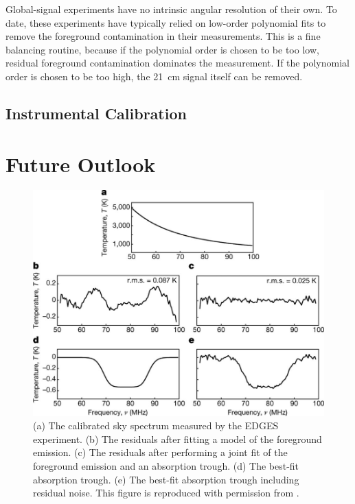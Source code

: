 \begin{bibunit}
Global-signal experiments have no intrinsic angular resolution of their own. To date, these
experiments have typically relied on low-order polynomial fits to remove the foreground
contamination in their measurements. This is a fine balancing routine, because if the polynomial
order is chosen to be too low, residual foreground contamination dominates the measurement. If the
polynomial order is chosen to be too high, the 21~cm signal itself can be removed.

\subsection{Instrumental Calibration}

\section{Future Outlook}

\begin{figure}[t]
    \centering
    \includegraphics[width=\textwidth]{figures/chapter1/bowman-2018-absorption-trough}
    \caption{
        (a) The calibrated sky spectrum measured by the EDGES experiment.
        (b) The residuals after fitting a model of the foreground emission.
        (c) The residuals after performing a joint fit of the foreground emission and an absorption
        trough.
        (d) The best-fit absorption trough.
        (e) The best-fit absorption trough including residual noise.
        This figure is reproduced with permission from \citet{2018Natur.555...67B}.
    }
    \label{fig:bowman-absorption-trough}
\end{figure}


\end{bibunit}
